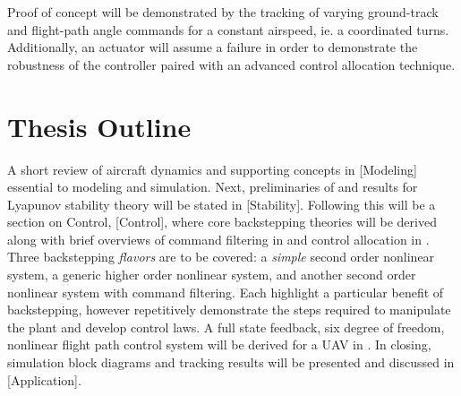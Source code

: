 \documentclass[12pt]{ucthesis}
\begin{document}
Proof of concept will be demonstrated by the tracking of varying ground-track and flight-path angle commands for a constant airspeed, ie. a coordinated turns. Additionally, an actuator will assume a failure in order to demonstrate the robustness of the controller paired with an advanced control allocation technique.

\section{Thesis Outline}
\label{sec: outline} %
A short review of aircraft dynamics and supporting concepts in [Modeling] essential to modeling and simulation. Next, preliminaries of and results for Lyapunov stability theory will be stated in [Stability]. Following this will be a section on Control, [Control], where core backstepping theories will be derived along with brief overviews of command filtering in  and control allocation in . Three backstepping \textit{flavors} are to be covered: a \textit{simple} second order nonlinear system, a generic higher order nonlinear system, and another second order nonlinear system with command filtering. Each highlight a particular benefit of backstepping, however repetitively demonstrate the steps required to manipulate the plant and develop control laws. A full state feedback, six degree of freedom, nonlinear flight path control system will be derived for a UAV in . In closing, simulation block diagrams and tracking results will be presented and discussed in [Application].
\end{document}
